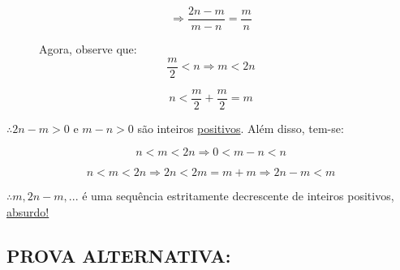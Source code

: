 \documentclass[a4paper, 12pt]{article}
\begin{document}
    \[\Rightarrow \frac{2n-m}{m-n} = \frac{m}{n}\]
    \begin{figure} [h!]
        \begin{minipage}[!] {0.4\linewidth}
            \caption{}
        \end{minipage}
        \begin{minipage}[!] {0.4\linewidth}
            {Agora, observe que:}
            \[\frac{m}{2} < n \Rightarrow m < 2n\]
    
            \[n < \frac{m}{2} + \frac{m}{2} = m\]
        \end{minipage}
    \end{figure} 
    
    \newpage
    {$\therefore 2n-m > 0$ e $ m-n > 0$ são inteiros \underline{positivos}. Além disso, tem-se:}
    
    \[n < m < 2n \Rightarrow 0 < m-n < n\]
    
    \[n < m < 2n \Rightarrow 2n < 2m = m + m \Rightarrow 2n - m < m\]
    
    
    {$\therefore m, 2n-m,...$ é uma sequência estritamente decrescente de inteiros positivos, \underline{absurdo!}}
    \subsection{PROVA ALTERNATIVA:} 

    
\end{document}
